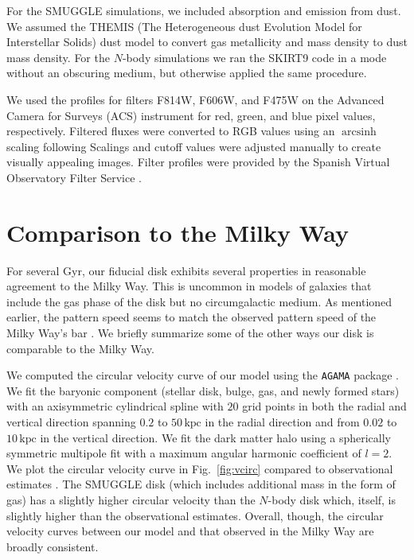\documentclass[fleqn,usenatbib]{mnras}
\newcommand{\Nbody}{$N$-body}
\DeclareMathOperator\arcsinh{arcsinh}
\begin{document}
For the SMUGGLE simulations, we included absorption and emission from dust. We
assumed the THEMIS (The Heterogeneous dust Evolution Model for Interstellar
Solids) dust model \citep{2017AA...602A..46J} to convert gas metallicity and
mass density to dust mass density. For the \Nbody{} simulations we ran the
SKIRT9 code in a mode without an obscuring medium, but otherwise applied the
same procedure.

We used the profiles for filters F814W, F606W, and F475W on the Advanced
Camera for Surveys (ACS) instrument for red, green, and blue pixel values,
respectively. Filtered fluxes were converted to RGB values using an $\arcsinh$
scaling following \citet{2004PASP..116..133L} Scalings and cutoff values
were adjusted manually to create visually appealing images. Filter profiles
were provided by the Spanish Virtual Observatory Filter
Service \citep{2012ivoa.rept.1015R, 2020sea..confE.182R}.

\section{Comparison to the Milky Way}
\label{app:milkyway}
For several Gyr, our fiducial disk exhibits several properties in reasonable
agreement to the Milky Way. This is uncommon in models of galaxies that include
the gas phase of the disk but no circumgalactic medium. As mentioned earlier,
the pattern speed seems to match the observed pattern speed of the Milky Way's
bar \citep{2019MNRAS.490.4740B}. We briefly summarize some of the other ways our
disk is comparable to the Milky Way.

We computed the circular velocity curve of our model using the \texttt{AGAMA}
package \citep{2019MNRAS.482.1525V}. We fit the baryonic component (stellar disk,
bulge, gas, and newly formed stars) with an axisymmetric cylindrical spline with
$20$ grid points in both the radial and vertical direction spanning $0.2$ to
$50\,\textrm{kpc}$ in the radial direction and from $0.02$ to $10\,\textrm{kpc}$
in the vertical direction. We fit the dark matter halo using a spherically
symmetric multipole fit with a maximum angular harmonic coefficient of $l=2$. We
plot the circular velocity curve in Fig.~\ref{fig:vcirc} compared to
observational estimates \citep{2019ApJ...871..120E}. The SMUGGLE disk (which
includes additional mass in the form of gas) has a slightly higher circular
velocity than the \Nbody{} disk which, itself, is slightly higher than the
observational estimates. Overall, though, the circular velocity curves between
our model and that observed in the Milky Way are broadly consistent.
\end{document}
